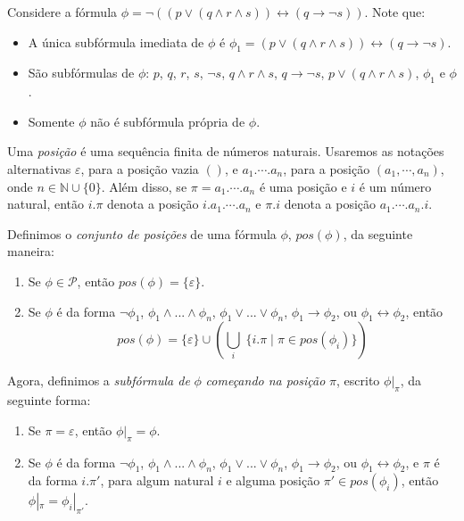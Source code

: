 \begin{example}
	Considere a fórmula $\phi = \neg((p \vee (q \wedge r \wedge s)) \leftrightarrow (q \rightarrow \neg s))$. Note que:
	\begin{itemize}
		\item A única subfórmula imediata de $\phi$ é $\phi_1 = (p \vee (q \wedge r \wedge s)) \leftrightarrow (q \rightarrow \neg s)$.
		\item São subfórmulas de $\phi$: $p$, $q$, $r$, $s$, $\neg s$, $q \wedge r \wedge s$, $q \rightarrow \neg s$, $p \vee (q \wedge r \wedge s)$, $\phi_1$ e $\phi$.
		\item Somente $\phi$ não é subfórmula própria de $\phi$.
	\end{itemize}
\end{example}

\begin{definition}
	Uma \emph{posição} é uma sequência finita de números naturais. Usaremos as notações alternativas $\varepsilon$, para a posição vazia $()$, e $a_1.\cdots.a_n$, para a posição $(a_1,\cdots,a_n)$, onde $n \in \mathbb{N} \cup \{0\}$. Além disso, se $\pi = a_1.\cdots.a_n$ é uma posição e $i$ é um número natural, então $i.\pi$ denota a posição $i.a_1.\cdots.a_n$ e $\pi.i$ denota a posição $a_1.\cdots.a_n.i$.
	
    Definimos o \emph{conjunto de posições} de uma fórmula $\phi$, $pos(\phi)$, da seguinte maneira:
    \begin{enumerate}
        \item Se $\phi \in \mathcal{P}$, então $pos(\phi) = \{\varepsilon\}$.
        \item Se $\phi$ é da forma $\neg \phi_1$, $\phi_1 \wedge ... \wedge \phi_n$, $\phi_1 \vee ... \vee \phi_n$, $\phi_1 \rightarrow \phi_2$, ou $\phi_1 \leftrightarrow \phi_2$, então $$pos(\phi) = \{\varepsilon\} \cup \left(\bigcup_i \; \{i.\pi \mid \pi \in pos(\phi_i)\}\right)$$
    \end{enumerate}
    
    Agora, definimos a \emph{subfórmula de} $\phi$ \emph{começando na posição} $\pi$, escrito $\phi|_\pi$, da seguinte forma:
    \begin{enumerate}
        \item Se $\pi = \varepsilon$, então $\phi|_\pi = \phi$.
        \item Se $\phi$ é da forma $\neg \phi_1$, $\phi_1 \wedge ... \wedge \phi_n$, $\phi_1 \vee ... \vee \phi_n$, $\phi_1 \rightarrow \phi_2$, ou $\phi_1 \leftrightarrow \phi_2$, e $\pi$ é da forma $i.\pi'$, para algum natural $i$ e alguma posição $\pi' \in pos(\phi_i)$, então $\phi|_\pi = \phi_i|_{\pi'}$.
    \end{enumerate}
\end{definition}

